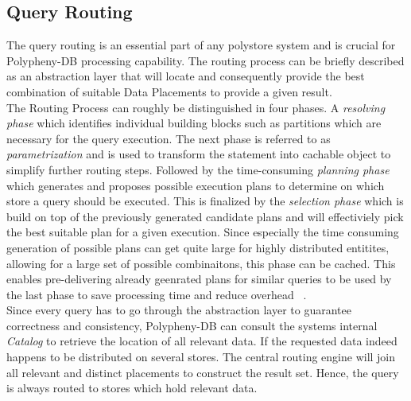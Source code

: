 \subsection{Query Routing}
\label{sec:routing}

The query routing is an essential part of any polystore system and is crucial for Polypheny-DB processing capability.
The routing process can be briefly described as an abstraction layer that will locate and consequently provide the best combination of suitable Data Placements to provide 
a given result. \\
The Routing Process can roughly be distinguished in four phases. A \emph{resolving phase} which identifies individual building blocks such as partitions which are necessary 
for the query execution. The next phase is referred to as \emph{parametrization} and is used to transform the statement into cachable object to simplify further routing steps.
Followed by the time-consuming \emph{planning phase} which generates and proposes possible execution plans to determine on which store a query should be executed.
This is finalized by the \emph{selection phase} which is build on top of the previously generated candidate plans and will effectiviely pick the best suitable plan for a 
given execution. Since especially the time consuming generation of possible plans can get quite large for highly distributed entitites, allowing for a large set of 
possible combinaitons, this phase can be cached.
This enables pre-delivering already geenrated plans for similar queries to be used by the last phase to save processing time and reduce overhead ~\cite{vogt_dis_2022}.\\


Since every query has to go through the abstraction layer to guarantee correctness 
and consistency, Polypheny-DB can consult the systems internal \textit{Catalog} to retrieve the
location of all relevant data. 
If the requested data indeed happens to be distributed on several stores. The central routing engine will join all relevant and distinct 
placements to construct the result set. Hence, the query is always routed to stores which hold relevant data.\\


